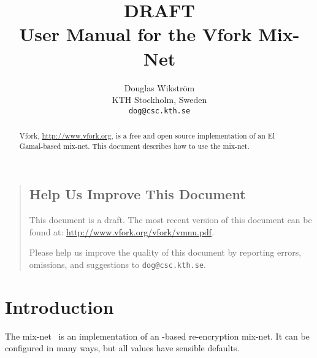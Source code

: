 \documentclass[11pt]{article}
\title{{\Huge DRAFT}\\$\quad$\\User Manual for the Vfork Mix-Net}
\author{Douglas Wikstr{\"o}m\\
KTH Stockholm, Sweden\\
\texttt{dog@csc.kth.se}}
\begin{document}


\maketitle

\thispagestyle{empty}

\begin{abstract}

  Vfork, \url{http://www.vfork.org}, is a free and open
  source implementation of an El Gamal-based mix-net. This document
  describes how to use the mix-net.

\end{abstract}

\begin{quote}

\vfill

\subsection*{Help Us Improve This Document}

This document is a draft. The most recent version of this
document can be found at:
\url{http://www.vfork.org/vfork/vmnu.pdf}.

Please help us improve the quality of this document by reporting
errors, omissions, and suggestions to
\texttt{dog@csc.kth.se}.


\end{quote}

\newpage

\begin{spacing}{0.9}

\setcounter{tocdepth}{1}

  \tableofcontents

\end{spacing}

\clearpage

\pagestyle{plain}
\setcounter{page}{1}

\section{Introduction}\label{sect:introduction}

The \veri mix-net~\cite{vmn} is an implementation of an \elgamal-based
re-encryption mix-net. It can be configured in many ways, but all
values have sensible defaults.
\end{document}

